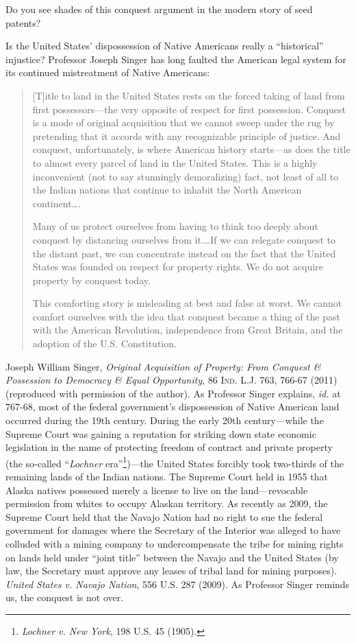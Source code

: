 Do you see shades of this conquest argument in the modern story of seed patents?

\item Is the United States' dispossession of Native Americans really a
``historical'' injustice? Professor Joseph Singer has long faulted the American
legal system for its continued mistreatment of Native Americans:
\begin{quotation}
[T]itle to land in the United States rests on the forced taking of land from
first possessors---the very opposite of respect for first possession. Conquest
is a mode of original acquisition that we cannot sweep under the rug by
pretending that it accords with any recognizable principle of justice. And
conquest, unfortunately, is where American history starts---as does the title to
almost every parcel of land in the United States. This is a highly inconvenient
(not to say stunningly demoralizing) fact, not least of all to the Indian
nations that continue to inhabit the North American continent\ldots .

Many of us protect ourselves from having to think too deeply about conquest by
distancing ourselves from it.\ldots If we can relegate conquest to the distant
past, we can concentrate instead on the fact that the United States was founded
on respect for property rights. We do not acquire property by conquest today.

This comforting story is misleading at best and false at worst. We cannot
comfort ourselves with the idea that conquest became a thing of the past with
the American Revolution, independence from Great Britain, and the adoption of
the U.S. Constitution.
\end{quotation}
Joseph William Singer, \textit{Original Acquisition of Property: From Conquest
\& Possession to Democracy \& Equal Opportunity}, 86 \textsc{Ind. L.J.} 763,
766-67 (2011) (reproduced with permission of the author). As Professor Singer
explains, \textit{id.} at 767-68, most of the federal government's dispossession
of Native American land occurred during the 19th century. During the early 20th
century---while the Supreme Court was gaining a reputation for striking down
state economic legislation in the name of protecting freedom of contract and
private property (the so-called ``\textit{Lochner} era''\footnote{\emph{Lochner
v. New York}, 198 U.S. 45 (1905).})---the United States forcibly took
two-thirds of the remaining lands of the Indian nations. The Supreme Court held
in 1955 that Alaska natives possessed merely a license to live on the
land---revocable permission from whites to occupy Alaskan territory. As recently
as 2009, the Supreme Court held that the Navajo Nation had no right to sue the
federal government for damages where the Secretary of the Interior was alleged
to have colluded with a mining company to undercompensate the tribe for mining
rights on lands held under ``joint title'' between the Navajo and the United
States (by law, the Secretary must approve any leases of tribal land for mining
purposes). \textit{United States v. Navajo Nation}, 556 U.S. 287 (2009). As
Professor Singer reminds us, the conquest is not over.


